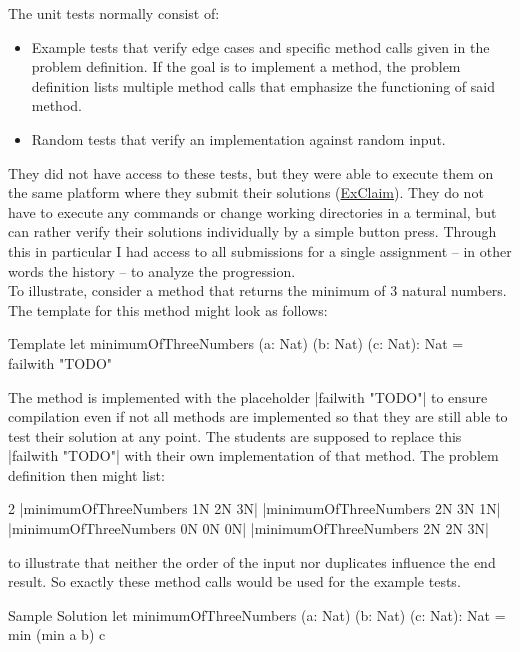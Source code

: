 \noindent The unit tests normally consist of:
\begin{itemize}[nosep]
    \item Example tests that verify edge cases and specific method calls given in the problem definition.
        If the goal is to implement a method, the problem definition lists multiple method calls that emphasize the functioning of said method.
    \item Random tests that verify an implementation against random input.
\end{itemize}

\noindent They did not have access to these tests, but they were able to execute them on the same platform where they submit their solutions (\href{https://exclaim.cs.rptu.de}{ExClaim}).
They do not have to execute any commands or change working directories in a terminal, but can rather verify their solutions individually by a simple button press.
Through this in particular I had access to all submissions for a single assignment -- in other words the history -- to analyze the progression.\\[5pt]
To illustrate, consider a method that returns the minimum of \(3\) natural numbers. The template for this method might look as follows:

\begin{fsharpcodeshort}{Template}{}
let minimumOfThreeNumbers (a: Nat) (b: Nat) (c: Nat): Nat =
    failwith "TODO"
\end{fsharpcodeshort}

\noindent The method is implemented with the placeholder \fsharp|failwith "TODO"| to ensure compilation even if not all methods are implemented so that they are still able to test their solution at any point.
The students are supposed to replace this \fsharp|failwith "TODO"| with their own implementation of that method. The problem definition then might list:
\begin{center}\begin{multicols}{2}
    \noindent
    \fsharp|minimumOfThreeNumbers 1N 2N 3N|
    \fsharp|minimumOfThreeNumbers 2N 3N 1N|
    \fsharp|minimumOfThreeNumbers 0N 0N 0N|
    \fsharp|minimumOfThreeNumbers 2N 2N 3N|
\end{multicols}\end{center}
\noindent to illustrate that neither the order of the input nor duplicates influence the end result. So exactly these method calls would be used for the example tests.

\begin{fsharpcodeshort}{Sample Solution}{}
let minimumOfThreeNumbers (a: Nat) (b: Nat) (c: Nat): Nat =
    min (min a b) c
\end{fsharpcodeshort}

